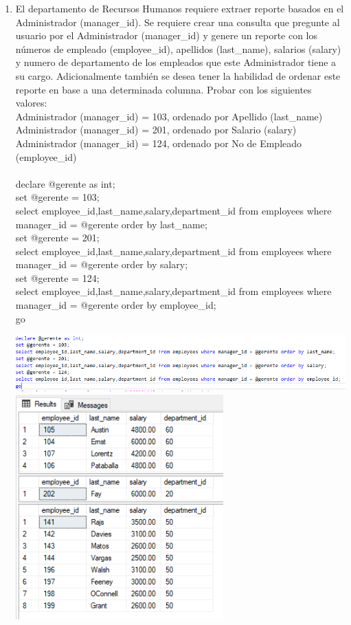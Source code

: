 \begin{enumerate}[1.]
	\item El departamento de Recursos Humanos requiere extraer reporte basados en el Administrador (manager\_id). Se requiere crear una consulta que pregunte al usuario por el Administrador (manager\_id) y genere un reporte con los números de empleado (employee\_id), apellidos (last\_name), salarios (salary) y numero de departamento de los empleados que este Administrador tiene a su cargo. Adicionalmente también se desea tener la habilidad de ordenar este reporte en base a una determinada columna. Probar con los siguientes valores:
	\\Administrador (manager\_id) = 103, ordenado por Apellido (last\_name)
	\\Administrador (manager\_id) = 201, ordenado por Salario (salary)
	\\Administrador (manager\_id) = 124, ordenado por No de Empleado (employee\_id)
	\\ \\declare @gerente as int;
	\\set @gerente = 103;
	\\select employee\_id,last\_name,salary,department\_id from employees where manager\_id = @gerente order by last\_name;
	\\set @gerente = 201;
	\\select employee\_id,last\_name,salary,department\_id from employees where manager\_id = @gerente order by salary;
	\\set @gerente = 124;
	\\select employee\_id,last\_name,salary,department\_id from employees where manager\_id = @gerente order by employee\_id;
	\\go
	
	\begin{center}
	\includegraphics[width=17cm]{./Imagenes/actividad_04_11a} 
	\includegraphics[width=8cm]{./Imagenes/actividad_04_11} 
	\end{center}


\end{enumerate}
